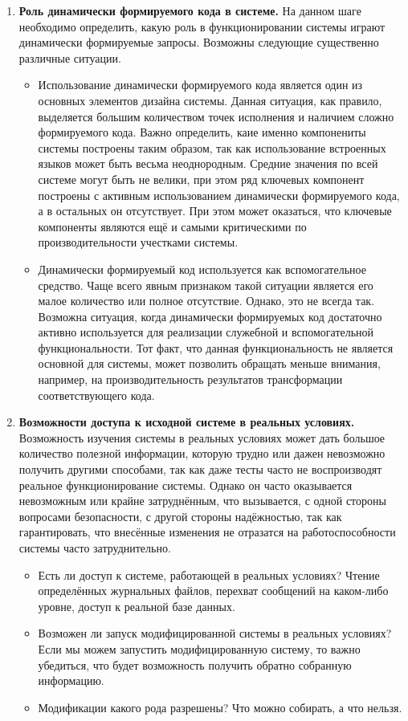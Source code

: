 \begin{enumerate}
  \item \textbf{Роль динамически формируемого кода в системе.} На данном шаге необходимо определить, какую роль в функционировании системы играют динамически формируемые запросы. Возможны следующие существенно различные ситуации.
  \begin{itemize}
    \item Использование динамически формируемого кода является один из основных элементов дизайна системы. Данная ситуация, как правило, выделяется большим количеством точек исполнения и наличием сложно формируемого кода. Важно определить, каие именно компонениты системы построены таким образом, так как использование встроенных языков может быть весьма неоднородным. Средние значения по всей системе могут быть не велики, при этом ряд ключевых компонент построены с активным использованием динамически формируемого кода, а в остальных он отсутствует. При этом может оказаться, что ключевые компоненты являются ещё и самыми критическими по производительности учестками системы.
    
    \item Динамически формируемый код используется как вспомогательное средство. Чаще всего явным признаком такой ситуации является его малое количество или полное отсутствие. Однако, это не всегда так. Возможна ситуация, когда динамически формируемых код достаточно активно используется для реализации служебной и вспомогательной функциональности. Тот факт, что данная функциональность не является основной для системы, может позволить обращать меньше внимания, например, на производительность результатов трансформации соответствующего кода.
  \end{itemize}
  
  \item \textbf{Возможности доступа к исходной системе в реальных условиях.} Возможность изучения системы в реальных условиях может дать большое количество полезной информации, которую трудно или дажен невозможно получить другими способами, так как даже тесты часто не воспроизводят реальное функционирование системы. Однако он часто оказывается невозможным или крайне затруднённым, что вызывается, с одной стороны вопросами безопасности, с другой стороны надёжностью, так как гарантировать, что внесённые изменения не отразатся на работоспособности системы часто затруднительно.  
  \begin{itemize}
    \item Есть ли доступ к системе, работающей в реальных условиях? Чтение определённых журнальных файлов, перехват сообщений на каком-либо уровне, доступ к реальной базе данных.
    \item Возможен ли запуск модифицированной системы в реальных условиях? Если мы можем запустить модифицированную систему, то важно убедиться, что будет возможность получить обратно собранную информацию.
    \item Модификации какого рода разрешены? Что можно собирать, а что нельзя.
  \end{itemize}
  

\end{enumerate}
